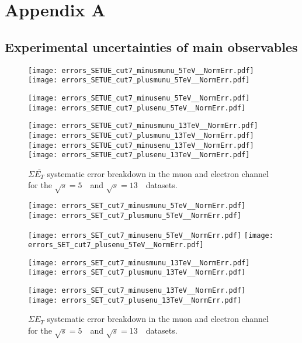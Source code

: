 \chapter{Appendix A}

\section{Experimental uncertainties of main observables}
\begin{figure}[h]
	\centering
	{\texttt{[image: errors\_SETUE\_cut7\_minusmunu\_5TeV\_\_NormErr.pdf]}\label{f:SETUEmm5}}
	{\texttt{[image: errors\_SETUE\_cut7\_plusmunu\_5TeV\_\_NormErr.pdf]}\label{f:SETUEpm5}}
	
	{\texttt{[image: errors\_SETUE\_cut7\_minusenu\_5TeV\_\_NormErr.pdf]}\label{f:}}
	{\texttt{[image: errors\_SETUE\_cut7\_plusenu\_5TeV\_\_NormErr.pdf]}\label{f:}}
	
	{\texttt{[image: errors\_SETUE\_cut7\_minusmunu\_13TeV\_\_NormErr.pdf]}\label{f:SETUEmm13}}
	{\texttt{[image: errors\_SETUE\_cut7\_plusmunu\_13TeV\_\_NormErr.pdf]}\label{f:SETUEpm13}}
	{\texttt{[image: errors\_SETUE\_cut7\_minusenu\_13TeV\_\_NormErr.pdf]}\label{f:}}
	{\texttt{[image: errors\_SETUE\_cut7\_plusenu\_13TeV\_\_NormErr.pdf]}\label{f:}}
	
	\caption{$\Sigma \bar{E_T}$ systematic error breakdown in the muon and electron channel  for the $\sqrt{s} = 5$~\TeV\ and $\sqrt{s} = 13$~\TeV\ datasets.}
\end{figure}
%

\begin{figure}[h]
	\centering
	{\texttt{[image: errors\_SET\_cut7\_minusmunu\_5TeV\_\_NormErr.pdf]}\label{f:set5}}
	{\texttt{[image: errors\_SET\_cut7\_plusmunu\_5TeV\_\_NormErr.pdf]}\label{f:setpl}}
	
	{\texttt{[image: errors\_SET\_cut7\_minusenu\_5TeV\_\_NormErr.pdf]}\label{f:}}
	{\texttt{[image: errors\_SET\_cut7\_plusenu\_5TeV\_\_NormErr.pdf]}\label{f:}}
	
	{\texttt{[image: errors\_SET\_cut7\_minusmunu\_13TeV\_\_NormErr.pdf]}\label{f:set13}}
	{\texttt{[image: errors\_SET\_cut7\_plusmunu\_13TeV\_\_NormErr.pdf]}\label{f:setpl13}}
	
	{\texttt{[image: errors\_SET\_cut7\_minusenu\_13TeV\_\_NormErr.pdf]}\label{f:}}
	{\texttt{[image: errors\_SET\_cut7\_plusenu\_13TeV\_\_NormErr.pdf]}\label{f:}}
		
	\caption{$\Sigma{E_T}$ systematic error breakdown in the muon and electron channel  for the $\sqrt{s} = 5$~\TeV\ and $\sqrt{s} = 13$~\TeV\ datasets.}
\end{figure}
\newpage


